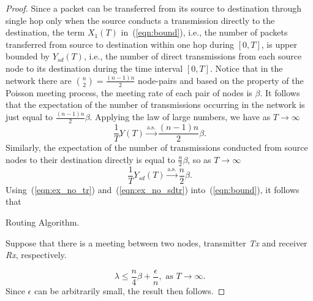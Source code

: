 \documentclass[twocolumn, 10pt]{svjour3}         \smartqed  \usepackage{graphicx}
\begin{document}
\begin{proof}
Since a packet can be transferred from its source to destination through single hop only when the source conducts a  transmission directly to the destination, the term $X_1 (T)$ in~(\ref{eqn:bound}), i.e., the number of packets transferred from source to destination within one hop during $[0,T]$,  is upper bounded by $Y_{sd}(T)$, i.e., the number of direct transmissions  from each source  node to its destination during the time interval $[0,T]$.
Notice that in the network there are $\binom{n}{2} = \frac{(n-1) n}{2}$ node-pairs and based on the property of the Poisson meeting process, the meeting rate of each pair of nodes is $\beta$.
It follows that the expectation of the number of transmissions occurring in the network is just equal to $\frac{(n-1) n}{2} \beta$.
Applying the law of large numbers, we have as $T \to \infty$
\begin{equation}
\frac{1}{T}Y(T)  \xrightarrow{\text{a.s.}} \frac{(n-1) n}{2} \beta   \label{eqn:ex_no_tr}.
\end{equation}
Similarly, the expectation of the number of transmissions conducted  from source nodes to their destination directly is equal to $\frac{n}{2}  \beta$, so as $T \to \infty$
\begin{equation}
\frac{1}{T}Y_{sd}(T)  \xrightarrow{\text{a.s.}} \frac{n}{2}  \beta \label{eqn:ex_no_sdtr}.
\end{equation}
Using~(\ref{eqn:ex_no_tr}) and~(\ref{eqn:ex_no_sdtr}) into~(\ref{eqn:bound}), it follows that 


\begin{algorithm}[!t]
\caption{Routing Algorithm.}
\label{alg:routing}
\begin{algorithmic}[1]
\STATE Suppose that there is a meeting between two nodes, transmitter  \emph{Tx} and  receiver \emph{Rx}, respectively.
\ELSE
{}
\ENDIF
\ELSE
{}
\ELSE
{}
\ENDIF
\ELSE
{}
\ELSE
{}
\ENDIF
\ENDIF
\ENDIF
\end{algorithmic}
\end{algorithm}
\begin{equation}
\lambda \leq \frac{n}{4} \beta + \frac{\epsilon}{n}, \text{  as } T \to \infty.
\end{equation}
Since  $\epsilon$ can be arbitrarily small, the result then follows.
\end{proof}
\end{document}
